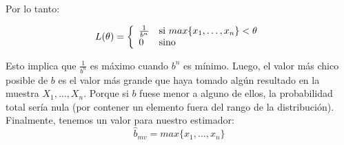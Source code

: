 Por lo tanto:

\begin{center}
\begin{displaymath}
L(\theta) = \left\{
\begin{array}{l l}
			\frac{1}{b^n} & \text{si }max\{x_{1}, \dots, x_{n}\} < \theta\\
			0 & \text{sino}
\end{array}
\right.
\end{displaymath}
\end{center}

Esto implica que $\frac{1}{b^n}$ es máximo cuando $b^n$ es mínimo. Luego, el valor más chico posible de $b$ es el valor más grande que haya tomado algún resultado en la muestra $X_{1}, \dots, X_{n}$. Porque si $b$ fuese menor a alguno de ellos, la probabilidad total sería nula (por contener un elemento fuera del rango de la distribución). Finalmente, tenemos un valor para nuestro estimador:
$$\hat{b}_{mv} = max\{x_{1}, \dots, x_{n}\}$$